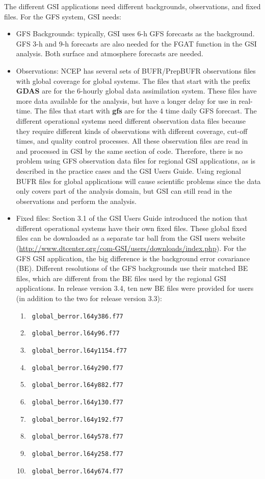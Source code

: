 The different GSI applications need different backgrounds, observations, and fixed files. For the GFS system, GSI needs:

\begin{itemize}
\item GFS Backgrounds: typically, GSI uses 6-h GFS forecasts as the background. GFS 3-h and 9-h forecasts are also needed for the FGAT function in 
the GSI analysis. Both surface and atmosphere forecasts are needed.
\item Observations: NCEP has several sets of BUFR/PrepBUFR observations files with global coverage for global systems. The files that start with the 
prefix \textbf{GDAS} are for the 6-hourly global data assimilation system. These files have more data available for the analysis, but have a longer delay 
for use in real-time. The files that start with \textbf{gfs} are for the 4 time daily GFS forecast. The different operational systems need different observation 
data files because they require different kinds of observations with different coverage, cut-off times, and quality control processes. All these observation 
files are read in and processed in GSI by the same section of code. Therefore, there is no problem using GFS observation data files for regional GSI 
applications, as is described in the practice cases and the GSI User\textquotesingle s Guide. Using regional BUFR files for global applications will cause 
scientific problems since the data only covers part of the analysis domain, but GSI can still read in the observations and perform the analysis.
\item Fixed files: Section 3.1 of the GSI User\textquotesingle s Guide introduced the notion that different operational systems have their own fixed files. 
These global fixed files can be downloaded as a separate tar ball from the GSI user\textquotesingle s website 
(\url{http://www.dtcenter.org/com-GSI/users/downloads/index.php}). For the GFS GSI application, the big difference is the background error covariance (BE). 
Different resolutions of the GFS backgrounds use their matched BE files, which are different from the BE files used by the regional GSI applications. In 
release version 3.4, ten new BE files were provided for users (in addition to the two for release version 3.3): \\
\begin{enumerate}
\item \verb| global_berror.l64y386.f77  |
\item \verb| global_berror.l64y96.f77  |
\item \verb| global_berror.l64y1154.f77 |	
\item \verb| global_berror.l64y290.f77 |	
\item \verb| global_berror.l64y882.f77 |
\item \verb| global_berror.l64y130.f77 |		
\item \verb| global_berror.l64y192.f77 |	
\item \verb| global_berror.l64y578.f77 |
\item \verb| global_berror.l64y258.f77 |	
\item \verb| global_berror.l64y674.f77 |
\end{enumerate}
\end{itemize}

